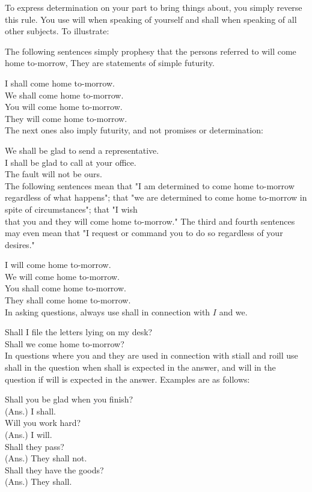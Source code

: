 \documentclass[10pt]{article}
\begin{document}
To express determination on your part to bring things about, you simply reverse this rule. You use will when speaking of yourself and shall when speaking of all other subjects. To illustrate:

The following sentences simply prophesy that the persons referred to will come home to-morrow, They are statements of simple futurity.

I shall come home to-morrow.\\
We shall come home to-morrow.\\
You will come home to-morrow.\\
They will come home to-morrow.\\
The next ones also imply futurity, and not promises or determination:

We shall be glad to send a representative.\\
I shall be glad to call at your office.\\
The fault will not be ours.\\
The following sentences mean that "I am determined to come home to-morrow regardless of what happens"; that "we are determined to come home to-morrow in spite of circumstances"; that "I wish\\
that you and they will come home to-morrow." The third and fourth sentences may even mean that "I request or command you to do so regardless of your desires."

I will come home to-morrow.\\
We will come home to-morrow.\\
You shall come home to-morrow.\\
They shall come home to-morrow.\\
In asking questions, always use shall in connection with $I$ and we.

Shall I file the letters lying on my desk?\\
Shall we come home to-morrow?\\
In questions where you and they are used in connection with stiall and roill use shall in the question when shall is expected in the answer, and will in the question if will is expected in the answer. Examples are as follows:

Shall you be glad when you finish?\\
(Ans.) I shall.\\
Will you work hard?\\
(Ans.) I will.\\
Shall they pass?\\
(Ans.) They shall not.\\
Shall they have the goods?\\
(Ans.) They shall.
\end{document}

